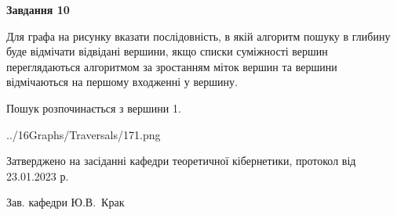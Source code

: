 \documentclass[12pt, ukrainian]{article}
\begin{document}
{\begin {large}
{\begin {center}\textbf{Завдання 10}\end {center}}\par
Для графа на рисунку вказати послідовність, в якій алгоритм пошуку в глибину буде відмічати відвідані вершини, якщо списки суміжності вершин переглядаються алгоритмом за зростанням міток вершин та вершини відмічаються на першому вход\-женні у вершину.\par
Пошук розпочинається з вершини 1.\par

\begin{center}
	{../16Graphs/Traversals/171.png}
\end{center}\par
\newpage


\end {large}
}
{\smallskip \begin {small} Затверджено на засіданні кафедри теоретичної кібернетики, протокол  від   23.01.2023 р.\par\smallskip\smallskip
{\parbox {6.5 cm}{Зав. кафедри \dotfill Ю.В.~Крак}} \end{small}}
\end{document}

